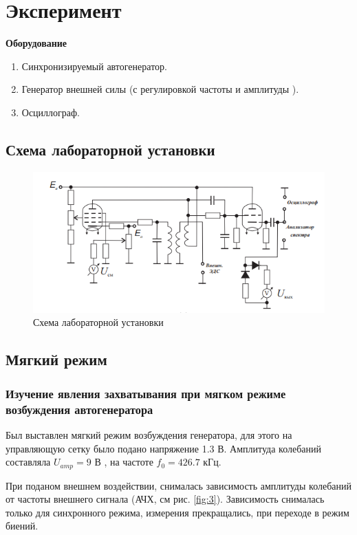 
\usepackage{mwe}



\def\labauthors{Виноградов И.Д., Шиков А.П.}
\def\labgroup{430}
\def\labnumber{1}
\def\labtheme{Вынужденная синхронизация}


\newpage
\section*{Эксперимент}
\textbf{Оборудование}
\begin{enumerate}
	\item Синхронизируемый автогенератор.
	\item Генератор внешней силы (с регулировкой частоты и амплитуды ).
	\item Осциллограф.
\end{enumerate}

\subsection*{Схема лабораторной установки}

\begin{figure}[h!]
	\centering
	\includegraphics[width = .7\linewidth]{img/scheme.png}
	\caption{Схема лабораторной установки}
	\label{fig:2}
\end{figure}

\subsection*{Мягкий режим}
\subsubsection*{Изучение явления захватывания при мягком режиме возбуждения автогенератора}
Был выставлен мягкий режим возбуждения генератора, для этого на управляющую сетку было подано напряжение 1.3 В.
Амплитуда колебаний составляла $U_{amp} = 9$ В , на частоте $f_0 = 426.7$ кГц.

При поданом внешнем воздействии, снималась зависимость амплитуды колебаний от частоты внешнего сигнала (АЧХ, см рис. \ref{fig:3}).
Зависимость снималась только для синхронного режима, измерения прекращались, при переходе в режим биений.

